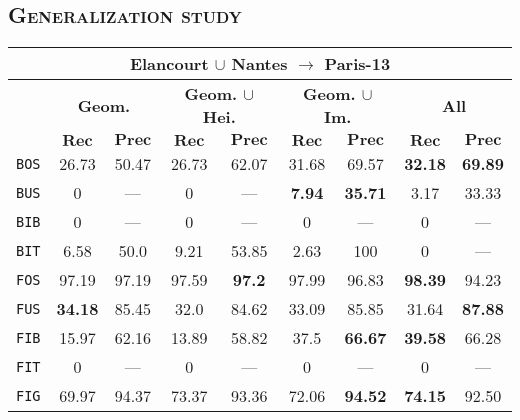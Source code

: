     \subsection{\textsc{Generalization study}}
        \begin{table}
            \footnotesize
            \begin{center}
                \begin{tabular}{|c | c c | c c | c c | c c |}
                    \hline
                    \multicolumn{9}{|c|}{\textbf{Elancourt $\cup$ Nantes $\rightarrow$ Paris-13}}\\
                    \hline
                    &\multicolumn{2}{c|}{\textbf{Geom.}} & \multicolumn{2}{c|}{\textbf{Geom. $\cup$ Hei.}} & \multicolumn{2}{c|}{\textbf{Geom. $\cup$ Im.}} & \multicolumn{2}{x{2.4cm}|}{\textbf{All}}\\
                    \cline{2-9}
                    & \(\bm{Rec}\) & \(\bm{Prec}\) &  \(\bm{Rec}\) & \(\bm{Prec}\) &  \(\bm{Rec}\) & \(\bm{Prec}\) &  \(\bm{Rec}\) & \(\bm{Prec}\) \\
                    \hline
                    \texttt{BOS} & 26.73 & 50.47 & 26.73 & 62.07 & 31.68 & 69.57 & \textbf{32.18} & \textbf{69.89} \\
                    \hline
                    \texttt{BUS} & 0 & --- & 0 & --- & \textbf{7.94} & \textbf{35.71} & 3.17 & 33.33 \\
                    \hline
                    \texttt{BIB} & 0 & --- & 0 & --- & 0 & --- & 0 & --- \\
                    \hline
                    \texttt{BIT} & 6.58 & 50.0 & 9.21 & 53.85 & 2.63 & 100 & 0 & --- \\
                    \hline
                    \texttt{FOS} & 97.19 & 97.19 & 97.59 & \textbf{97.2} & 97.99 & 96.83 & \textbf{98.39} & 94.23 \\
                    \hline
                    \texttt{FUS} & \textbf{34.18} & 85.45 & 32.0 & 84.62 & 33.09 & 85.85 & 31.64 & \textbf{87.88} \\
                    \hline
                    \texttt{FIB} & 15.97 & 62.16 & 13.89 & 58.82 & 37.5 & \textbf{66.67} & \textbf{39.58} & 66.28 \\
                    \hline
                    \texttt{FIT} & 0 & --- & 0 & --- & 0 & --- & 0 & --- \\
                    \hline
                    \texttt{FIG} & 69.97 & 94.37 & 73.37 & 93.36 & 72.06 & \textbf{94.52} & \textbf{74.15} & 92.50 \\

\end{tabular}
\end{center}
\end{table}
